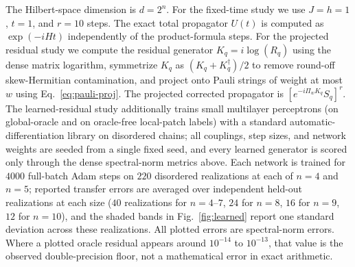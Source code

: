 \documentclass[aps,prresearch,reprint,superscriptaddress,nofootinbib,amsmath,amssymb]{revtex4-2}
\begin{document}
The Hilbert-space dimension is $d=2^n$. For the fixed-time study we use $J=h=1$, $t=1$, and $r=10$ steps. The exact total propagator $U(t)$ is computed as $\exp(-iHt)$ independently of the product-formula steps. For the projected residual study we compute the residual generator $K_q=i\log(R_q)$ using the dense matrix logarithm, symmetrize $K_q$ as $(K_q+K_q^\dagger)/2$ to remove round-off skew-Hermitian contamination, and project onto Pauli strings of weight at most $w$ using Eq.~\eqref{eq:pauli-proj}. The projected corrected propagator is $[e^{-i\Pi_wK_q}S_q]^r$. The learned-residual study additionally trains small multilayer perceptrons (on global-oracle and on oracle-free local-patch labels) with a standard automatic-differentiation library on disordered chains; all couplings, step sizes, and network weights are seeded from a single fixed seed, and every learned generator is scored only through the dense spectral-norm metrics above. Each network is trained for $4000$ full-batch Adam steps on $220$ disordered realizations at each of $n=4$ and $n=5$; reported transfer errors are averaged over independent held-out realizations at each size ($40$ realizations for $n=4$--$7$, $24$ for $n=8$, $16$ for $n=9$, $12$ for $n=10$), and the shaded bands in Fig.~\ref{fig:learned} report one standard deviation across these realizations. All plotted errors are spectral-norm errors. Where a plotted oracle residual appears around $10^{-14}$ to $10^{-13}$, that value is the observed double-precision floor, not a mathematical error in exact arithmetic.
\end{document}
